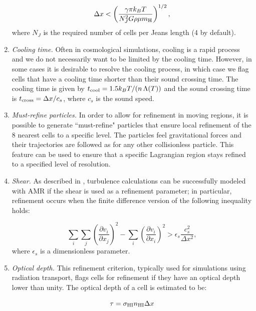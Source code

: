 \begin{enumerate}
\begin{equation}
\Delta x < \left( \frac{\gamma \pi k_B T}{N_J^2 G \rho \mu \mh} \right)^{1/2},
\end{equation}
where $N_J$ is the required number of cells per Jeans length (4 by default).

\item{\em Cooling time.}  Often in cosmological simulations, cooling
  is a rapid process and we do not necessarily want to be limited by
  the cooling time.  However, in some cases it is desirable to resolve
  the cooling process, in which case we flag cells that have a cooling
  time shorter than their sound crossing time.  The cooling time is
  given by $t_{\rm cool} = 1.5 k_BT / (n\, \Lambda(T))$ and the sound
  crossing time is $t_{\rm cross} = \Delta x / c_s$, where $c_s$ is
  the sound speed.


\item{\em Must-refine particles.}  In order to allow for refinement in
  moving regions, it is possible to generate ``must-refine" particles
  that ensure local refinement of the 8 nearest cells to a specific
  level.  The particles feel gravitational forces and their
  trajectories are followed as for any other collisionless particle.
  This feature can be used to ensure that a specific Lagrangian region
  stays refined to a specified level of resolution. 


\item{\em Shear.} As described in \citet{Kritsuk06}, turbulence
  calculations can be successfully modeled with AMR if the shear is
  used as a refinement parameter; in particular, refinement occurs
  when the finite difference version of the following inequality
  holds:

\begin{equation}
\sum_i \sum_j \left( \frac{\partial v_i}{\partial x_j} \right)^2 -  \sum_i \left( \frac{\partial v_i}{\partial x_i} \right)^2
> \epsilon_s \frac{c_s^2}{\Delta x^2},
\end{equation}
where $\epsilon_s$ is a dimensionless parameter.

\item{\em Optical depth.} This refinement criterion, typically used
for simulations using radiation transport, flags cells for refinement
if they have an  optical depth lower than unity.  The
optical depth of a cell is estimated to be:

\begin{equation}
\tau = \sigma_{\rm HI} n_{\rm HI} \Delta x 
\end{equation}


\end{enumerate}
